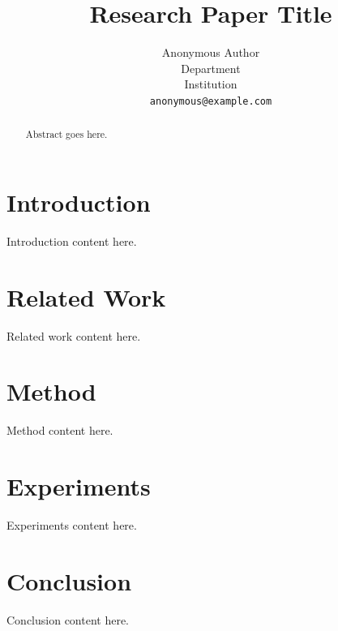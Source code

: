 \documentclass{article}
\title{Research Paper Title}
\author{
  Anonymous Author\\
  Department\\
  Institution\\
  \texttt{anonymous@example.com} \\
}
\begin{document}
\maketitle

\begin{abstract}
Abstract goes here.
\end{abstract}

\section{Introduction}
\label{sec:introduction}

Introduction content here.

\section{Related Work}
\label{sec:related}

Related work content here.

\section{Method}
\label{sec:method}

Method content here.

\section{Experiments}
\label{sec:experiments}

Experiments content here.

\section{Conclusion}
\label{sec:conclusion}

Conclusion content here.



\end{document}
